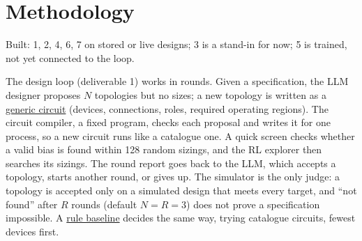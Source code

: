 \documentclass[10pt]{article}
\begin{document}
\section{Methodology}\label{sec:loop}
\begin{center}

{\footnotesize Built: 1, 2, 4, 6, 7 on stored or live designs; 3 is a stand-in for now; 5 is trained, not yet connected to the loop.}
\end{center}
\vspace{-4pt}
The design loop (deliverable 1) works in rounds. Given a specification, the LLM designer proposes $N$ topologies but no sizes; a new topology is written as a \uline{generic circuit} (devices, connections, roles, required operating
regions). The circuit compiler, a fixed program, checks each proposal and writes it for
one process, so a new circuit runs like a catalogue one. A quick screen checks whether a valid bias is found within
128 random sizings, and the RL explorer then searches its sizings. The round report goes back to the LLM, which accepts a
topology, starts another round, or gives up. The simulator is the only judge: a topology is accepted only on a
simulated design that meets every target, and ``not found'' after $R$ rounds (default $N = R = 3$) does not prove a
specification impossible. A \uline{rule baseline} decides the same way, trying catalogue circuits, fewest devices first.
\end{document}
